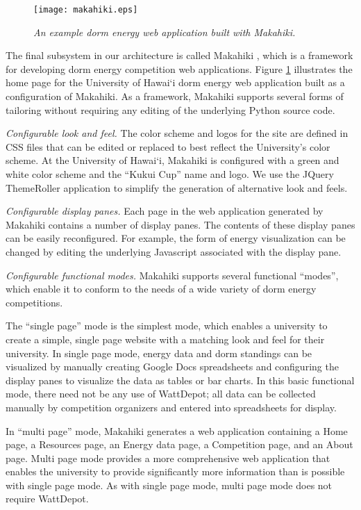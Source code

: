 \begin{figure}[htbp]
  \center
  \texttt{[image: makahiki.eps]}
  \caption{\em \small An example dorm energy web application built with Makahiki.}
  \label{fig:makahiki}
\end{figure} 

The final subsystem in our architecture is called Makahiki \cite{makahiki-site}, which is a
framework for developing dorm energy competition web applications.  Figure
\ref{fig:makahiki} illustrates the home page for the University of Hawai`i
dorm energy web application built as a configuration of Makahiki. As a
framework, Makahiki supports several forms of tailoring without requiring
any editing of the underlying Python source code.

{\em Configurable look and feel.} The color scheme and logos for the site
are defined in CSS files that can be edited or replaced to best reflect the
University's color scheme. At the University of Hawai`i, Makahiki is
configured with a green and white color scheme and the ``Kukui Cup'' name
and logo.   We use the JQuery ThemeRoller application to simplify the generation of 
alternative look and feels.

{\em Configurable display panes.} Each page in the web application generated by Makahiki
contains a number of display panes. The contents of these display panes can be easily 
reconfigured. For example, the form of energy visualization can be changed by editing 
the underlying Javascript associated with the display pane. 

{\em Configurable functional modes.}  Makahiki supports several functional ``modes'', which 
enable it to conform to the needs of a wide variety of dorm energy competitions.  

The ``single page'' mode is the simplest mode, which enables a university
to create a simple, single page website with a matching look and feel for
their university.  In single page mode, energy data and dorm standings can
be visualized by manually creating Google Docs spreadsheets and configuring
the display panes to visualize the data as tables or bar charts.  In this
basic functional mode, there need not be any use of WattDepot; all data can
be collected manually by competition organizers and entered into
spreadsheets for display.

In ``multi page'' mode, Makahiki generates a web application containing a
Home page, a Resources page, an Energy data page, a Competition page, and
an About page.  Multi page mode provides a more comprehensive web
application that enables the university to provide significantly more
information than is possible with single page mode.  As with single page
mode, multi page mode does not require WattDepot.

